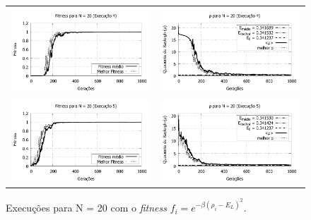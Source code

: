 \begin{figure}[p]
\begin{tabular}{@{}cc@{}}
		\includegraphics[width=.40\textwidth]{figs/resultados/fitnessEL/N-20_E-4_fitness-extendido.pdf} &
    \includegraphics[width=.40\textwidth]{figs/resultados/fitnessEL/N-20_E-4_rho_extendido.pdf} \\
		\includegraphics[width=.40\textwidth]{figs/resultados/fitnessEL/N-20_E-5_fitness-extendido.pdf} &
    \includegraphics[width=.40\textwidth]{figs/resultados/fitnessEL/N-20_E-5_rho_extendido.pdf}
  \end{tabular}
  \caption{Execuções para N = 20 com o \textit{fitness} $f_i = e^{-\beta(\rho_i - E_L)^2}$.}
	\label{fig:execucoes_N20_EL}
	\end{figure}
	
